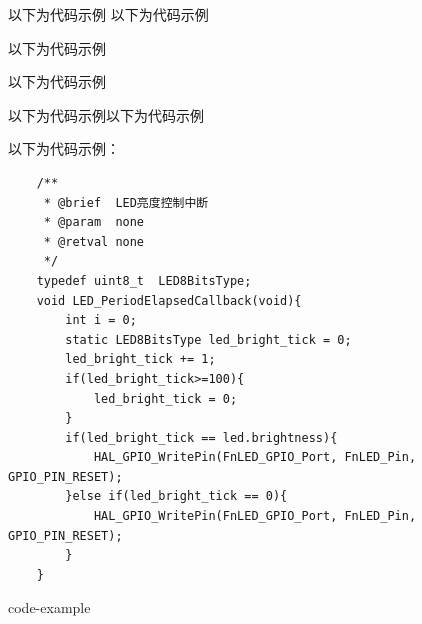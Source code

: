 以下为代码示例
以下为代码示例

以下为代码示例

以下为代码示例

以下为代码示例以下为代码示例

以下为代码示例：

\begin{listing}[htbp]
  \begin{verbatim}
    /**
     * @brief  LED亮度控制中断
     * @param  none
     * @retval none
     */
    typedef uint8_t  LED8BitsType;
    void LED_PeriodElapsedCallback(void){
        int i = 0;
        static LED8BitsType led_bright_tick = 0;
        led_bright_tick += 1;
        if(led_bright_tick>=100){
            led_bright_tick = 0;
        }
        if(led_bright_tick == led.brightness){
            HAL_GPIO_WritePin(FnLED_GPIO_Port, FnLED_Pin, GPIO_PIN_RESET);
        }else if(led_bright_tick == 0){
            HAL_GPIO_WritePin(FnLED_GPIO_Port, FnLED_Pin, GPIO_PIN_RESET);
        }
    }
    \end{verbatim}
    \caption{code-example}
    \label{listing:example}
\end{listing}

